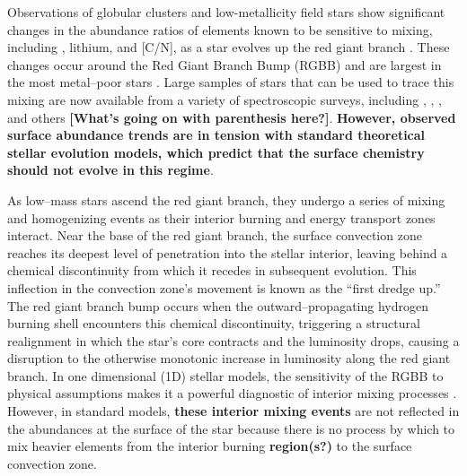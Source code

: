 Observations of globular clusters and low-metallicity field stars show significant changes in the abundance ratios of elements known to be sensitive to mixing, including \ctwelvecthirteen, lithium, and [C/N], as a star evolves up the red giant branch \citep{Carbon1982, Pilachowski1986, Kraft1994, Shetrone2019}. 
These changes occur around the Red Giant Branch Bump (RGBB) %
and are largest in the most metal--poor stars \citep[e.g.][]{Gratton2000}. Large samples of stars that can be used to trace this mixing are now available from a variety of spectroscopic surveys, including \citep[GALAH,][]{buder2019}, \citep[APOGEE,][]{DR17}, \citep[GAIA-ESO,][]{Magrini2021b}, and others \textbf{[What's going on with parenthesis here?]}. 
\textbf{However, observed surface abundance trends
are in tension with standard theoretical stellar evolution models, which predict that the surface chemistry should not evolve in this regime}.


As low--mass stars ascend the red giant branch, they undergo a series of mixing and homogenizing events as their interior burning and energy transport zones interact. Near the base of the red giant branch, the surface convection zone reaches its deepest level of penetration into the stellar interior, leaving behind a chemical discontinuity from which it recedes in subsequent evolution. This inflection in the convection zone's movement is known as the ``first dredge up.'' The red giant branch bump occurs when the outward--propagating hydrogen burning shell encounters this chemical discontinuity, triggering a structural realignment in which the star's core contracts and the luminosity drops, causing a disruption to the otherwise monotonic increase in luminosity along the red giant branch. In one dimensional (1D) stellar models, the sensitivity of the RGBB to physical assumptions makes it a powerful diagnostic of interior mixing processes \citep[e.g.][]{Christensen-Dalsgaard:2015, Joyce2015, Khan2018}. 
%
However, in standard models, \textbf{these interior mixing events} are not reflected in the abundances at the surface of the star because there is no process by which to mix heavier elements from the interior burning \textbf{region(s?)} to the surface convection zone.  %

